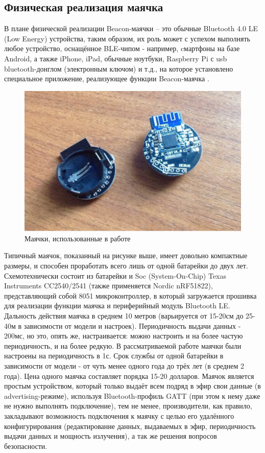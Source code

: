 \subsection{Физическая реализация маячка}

В плане физической реализации Beacon-маячки – это обычные Bluetooth 4.0 LE (Low Energy) устройства, таким образом, их роль может с успехом выполнять любое устройство, оснащённое BLE-чипом - например, cмартфоны на базе Android, а также iPhone, iPad, обычные ноутбуки, Raspberry Pi с usb bluetooth-донглом (электронным ключом) и т.д., на которое установлено специальное приложение, реализующее функции Beacon-маячка \cite{web:HabrBig}.

\begin{figure}[h]
    \centering
    \includegraphics[scale=0.4]{img/beacons.png}
    \caption{Маячки, использованные в работе}
\end{figure}

Типичный маячок, показанный на рисунке выше, имеет довольно компактные размеры, и способен проработать всего лишь от одной батарейки до двух лет. Схемотехнически состоит из батарейки и Soc (System-On-Chip) Texas Instruments CC2540/2541 (также применяется Nordic nRF51822), представляющий собой 8051 микроконтроллер, в который загружается прошивка для реализации функции маячка и периферийный модуль Bluetooth LE. Дальность действия маячка в среднем 10 метров (варьируется от 15-20см до 25-40м в зависимости от модели и настроек). Периодичность выдачи данных - 200мс, но это, опять же, настраивается: можно настроить и на более частую периодичность, и на более редкую. В рассматриваемой работе маячки были настроены на периодичность в 1с. Срок службы от одной батарейки в зависимости от модели - от чуть менее одного года до трёх лет (в среднем 2 года). Цена одного маячка составляет порядка 15-20 долларов. Маячок является простым устройством, который только выдаёт всем подряд в эфир свои данные (в advertising-режиме), используя Bluetooth-профиль GATT (при этом к нему даже не нужно выполнять подключение), тем не менее, производители, как правило, закладывают возможность подключения к маячку с целью его удалённого конфигурирования (редактирование данных, выдаваемых в эфир, периодичность выдачи данных и мощность излучения), а так же решения вопросов безопасности.
